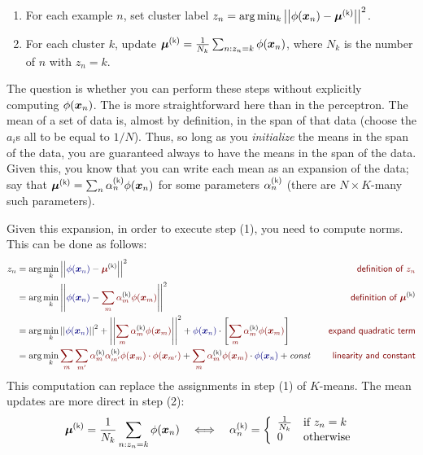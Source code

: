 \begin{enumerate}
\item For each example $n$, set cluster label $z_n = \arg\min_k
  \norm{\phi(\vx_n) - \vec\mu\kth}^2$.
\item For each cluster $k$, update $\vec\mu\kth = \frac 1 {N_k}
  \sum_{n : z_n=k} \phi(\vx_n)$, where $N_k$ is the number of $n$ with
  $z_n=k$.
\end{enumerate}

The question is whether you can perform these steps without explicitly
computing $\phi({\boldsymbol{x}}_n)$.  The  is more
straightforward here than in the perceptron.  The mean of a set of
data is, almost by definition, in the span of that data (choose the
$a_i$s all to be equal to $1/N$).  Thus, so long as you
\emph{initialize} the means in the span of the data, you are
guaranteed always to have the means in the span of the data.  Given
this, you know that you can write each mean as an expansion of the
data; say that $\vec\mu\kth = \sum_n \al\kth_n \phi(\vx_n)$ for some
parameters $\al\kth_n$ (there are $N\times K$-many such parameters).

Given this expansion, in order to execute step (1), you need to
compute norms.  This can be done as follows:
%
\begin{align}
z_n 
&= \arg\min_k \norm{\textcolor{darkblue}{\phi(\vx_n)} - \textcolor{darkred}{\vec\mu\kth}}^2
   \becauseof{definition of $z_n$} \\
&= \arg\min_k \norm{\textcolor{darkblue}{\phi(\vx_n)} - \textcolor{darkred}{\sum_m \al\kth_m \phi(\vx_m)}}^2
   \becauseof{definition of $\vec\mu\kth$} \\
&= \arg\min_k \norm{\textcolor{darkblue}{\phi(\vx_n)}}^2+ \norm{\textcolor{darkred}{\sum_m \al\kth_m \phi(\vx_m)}}^2
   + \dotp{\textcolor{darkblue}{\phi(\vx_n)}}{\left[ \textcolor{darkred}{\sum_m \al\kth_m \phi(\vx_m)} \right]}
   \becauseof{expand quadratic term} \\
&= \arg\min_k \textcolor{darkred}{\sum_m \sum_{m'} \al\kth_m \al\kth_{m'} \dotp{\phi(\vx_m)}{\phi(\vx_{m'})}}
   + \textcolor{darkred}{\sum_m \al\kth_m} \dotp{\textcolor{darkred}{\phi(\vx_m)}}{\textcolor{darkblue}{\phi(\vx_n)}}
   + \textit{const}
   \becauseof{linearity and constant}
\end{align}
%
This computation can replace the assignments in step (1) of
$K$-means.  The mean updates are more direct in step (2):
%
\begin{align}
\vec\mu\kth = \frac 1 {N_k} \sum_{n : z_n=k} \phi(\vx_n)
\quad\Longleftrightarrow\quad
\al\kth_n = \brack{\frac 1 {N_k} & \text{if } z_n = k \\ 0 & \text{otherwise}}
\end{align}



